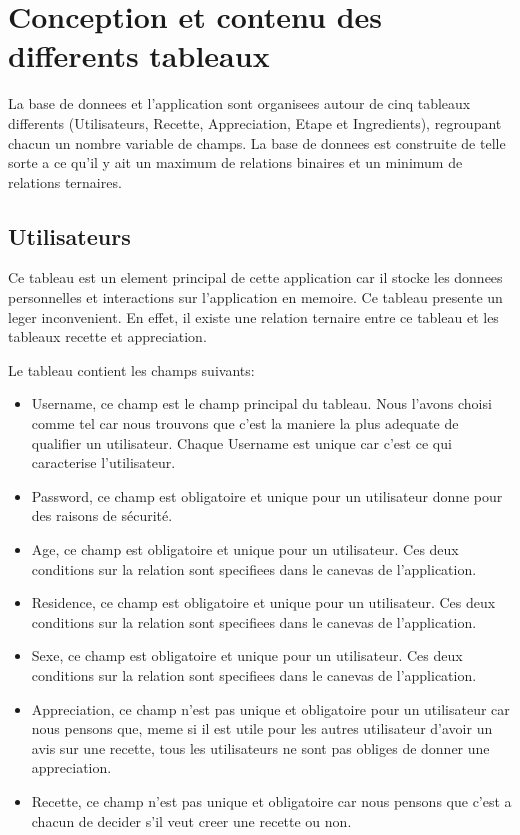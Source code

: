 \documentclass[a4paper,10pt]{report}
\begin{document}
\pagebreak

\chapter{Conception et contenu des differents tableaux}

La base de donnees et l'application sont organisees autour de cinq tableaux differents (Utilisateurs, Recette, Appreciation, Etape et Ingredients), regroupant chacun un nombre variable de champs.  La base de donnees est construite de telle sorte a ce qu'il y ait un maximum de relations binaires et un minimum de relations ternaires.

\section{Utilisateurs}

Ce tableau est un element principal de cette application car il stocke les donnees personnelles et interactions sur l'application en memoire. Ce tableau presente un leger inconvenient. En effet, il existe une relation ternaire entre ce tableau et les tableaux recette et appreciation.

Le tableau contient les champs suivants:
\begin{itemize}
	\item Username, ce champ est le champ principal du tableau. Nous l'avons choisi comme tel car nous trouvons que c'est la maniere la plus adequate de qualifier un utilisateur. Chaque Username est unique car c'est ce qui caracterise l'utilisateur.
	\item Password, ce champ est obligatoire et unique pour un utilisateur donne pour des raisons de sécurité.
	\item Age, ce champ est obligatoire et unique pour un utilisateur. Ces deux conditions sur la relation sont specifiees dans le canevas de l'application.
	\item Residence, ce champ est obligatoire et unique pour un utilisateur. Ces deux conditions sur la relation sont specifiees dans le canevas de l'application.
	\item Sexe, ce champ est obligatoire et unique pour un utilisateur. Ces deux conditions sur la relation sont specifiees dans le canevas de l'application.
	\item Appreciation, ce champ n'est pas unique et obligatoire pour un utilisateur car nous pensons que, meme si il est utile pour les autres utilisateur d'avoir un avis sur une recette, tous les utilisateurs ne sont pas obliges de donner une appreciation.
	\item Recette, ce champ n'est pas unique et obligatoire car nous pensons que c'est a chacun de decider s'il veut creer une recette ou non.%
\end{itemize}
\end{document}
